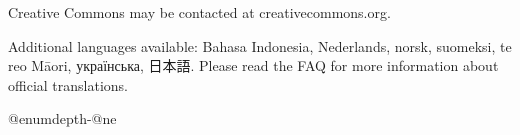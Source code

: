 Creative Commons may be contacted at creativecommons.org.
\par Additional languages available: Bahasa Indonesia, Nederlands, norsk, suomeksi, te reo Māori, українська, 日本語. Please read the FAQ for more information about official translations. 


\advance\csname @enumdepth\endcsname-\csname @ne\endcsname

